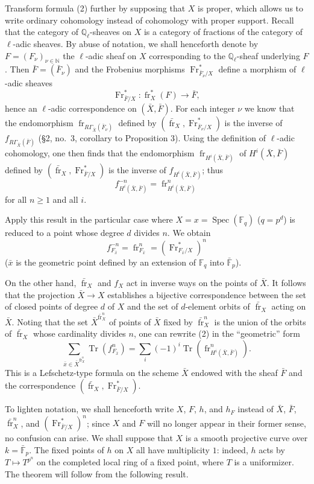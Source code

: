 \documentclass[11pt]{article}
\DeclareMathOperator{\Spec}{Spec}
\providecommand{\Tr}{\operatorname{Tr}}
\providecommand{\Tr}{\operatorname{Tr}}
\providecommand{\Tr}{\operatorname{Tr}}
\providecommand{\Tr}{\operatorname{Tr}}
\providecommand{\Spec}{\operatorname{Spec}}
\providecommand{\Spec}{\operatorname{Spec}}
\providecommand{\Spec}{\operatorname{Spec}}
\providecommand{\Tr}{\operatorname{Tr}}
\providecommand{\fr}{\operatorname{fr}}
\providecommand{\Fr}{\operatorname{Fr}}
\providecommand{\Fr}{\operatorname{Fr}}
\providecommand{\fr}{\operatorname{fr}}
\providecommand{\Spec}{\operatorname{Spec}}
\begin{document}
Transform formula (2) further by supposing that $X$ is proper, which allows us to write ordinary cohomology instead of cohomology with proper support. Recall that the category of $\mathbb Q_\ell$-sheaves on $X$ is a category of fractions of the category of $\ell$-adic sheaves. By abuse of notation, we shall henceforth denote by $F=(F_\nu)_{\nu\in\mathbb N}$ the $\ell$-adic sheaf on $X$ corresponding to the $\mathbb Q_\ell$-sheaf underlying $F$. Then $\bar F=(\bar F_\nu)$ and the Frobenius morphisms $\Fr^*_{\bar F_\nu/X}$ define a morphism of $\ell$-adic sheaves
\[
\Fr^*_{\bar F/X}:\fr_X^*(F)\longrightarrow\bar F,
\]
hence an $\ell$-adic correspondence on $(\bar X,\bar F)$. For each integer $\nu$ we know that the endomorphism $\fr_{R\Gamma_{\bar X}(\bar F_\nu)}$ defined by $(\bar{\fr}_X,\Fr^*_{\bar F_\nu/X})$ is the inverse of $f_{R\Gamma_{\bar X}(\bar F)}$ (§2, no.~3, corollary to Proposition 3). Using the definition of $\ell$-adic cohomology, one then finds that the endomorphism $\fr_{H^i(\bar X,\bar F)}$ of $H^i(\bar X,\bar F)$ defined by $(\bar{\fr}_X,\Fr^*_{\bar F/X})$ is the inverse of $f_{H^i(\bar X,\bar F)}$; thus
\[
f^{-n}_{H^i(\bar X,\bar F)}=\fr^n_{H^i(\bar X,\bar F)}
\]
for all $n\ge1$ and all $i$.

Apply this result in the particular case where $X=x=\Spec(\mathbb F_q)$ ($q=p^d$) is reduced to a point whose degree $d$ divides $n$. We obtain
\[
f^{-n}_{F_{\bar x}}=\fr^n_{F_{\bar x}}=(\Fr^*_{F_{\bar x}/X})^n
\]
($\bar x$ is the geometric point defined by an extension of $\mathbb F_q$ into $\bar{\mathbb F}_p$).

On the other hand, $\bar{\fr}_X$ and $f_X$ act in inverse ways on the points of $\bar X$. It follows that the projection $\bar X\to X$ establishes a bijective correspondence between the set of closed points of degree $d$ of $X$ and the set of $d$-element orbits of $\bar{\fr}_X$ acting on $\bar X$. Noting that the set $\bar X^{\bar{\fr}_X^n}$ of points of $\bar X$ fixed by $\bar{\fr}_X^n$ is the union of the orbits of $\bar{\fr}_X$ whose cardinality divides $n$, one can rewrite (2) in the ``geometric'' form
\[
\sum_{\bar x\in\bar X^{\bar{\fr}_X^n}}\Tr(f_{F_{\bar x}}^n)
=\sum_i(-1)^i\Tr(\fr^n_{H^i(\bar X,\bar F)}).
\tag{2'}
\]
This is a Lefschetz-type formula on the scheme $\bar X$ endowed with the sheaf $\bar F$ and the correspondence $(\bar{\fr}_X,\Fr^*_{\bar F/X})$.

To lighten notation, we shall henceforth write $X$, $F$, $h$, and $h_F$ instead of $\bar X$, $\bar F$, $\bar{\fr}_X^n$, and $(\Fr^*_{\bar F/X})^n$; since $X$ and $F$ will no longer appear in their former sense, no confusion can arise. We shall suppose that $X$ is a smooth projective curve over $k=\bar{\mathbb F}_p$. The fixed points of $h$ on $X$ all have multiplicity $1$: indeed, $h$ acts by $T\mapsto T^{p^n}$ on the completed local ring of a fixed point, where $T$ is a uniformizer. The theorem will follow from the following result.
\end{document}
